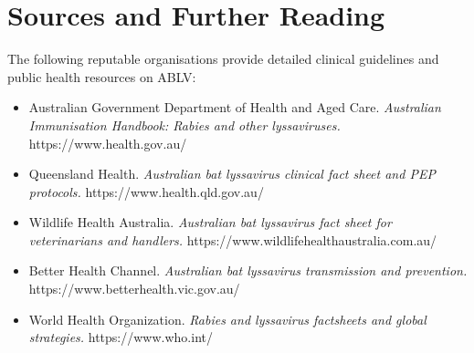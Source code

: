 \section*{Sources and Further Reading}
The following reputable organisations provide detailed clinical guidelines and public health resources on ABLV:
\begin{itemize}
    \item Australian Government Department of Health and Aged Care. \textit{Australian Immunisation Handbook: Rabies and other lyssaviruses.} https://www.health.gov.au/
    \item Queensland Health. \textit{Australian bat lyssavirus clinical fact sheet and PEP protocols.} https://www.health.qld.gov.au/
    \item Wildlife Health Australia. \textit{Australian bat lyssavirus fact sheet for veterinarians and handlers.} https://www.wildlifehealthaustralia.com.au/
    \item Better Health Channel. \textit{Australian bat lyssavirus transmission and prevention.} https://www.betterhealth.vic.gov.au/
    \item World Health Organization. \textit{Rabies and lyssavirus factsheets and global strategies.} https://www.who.int/
\end{itemize}

\clearpage
